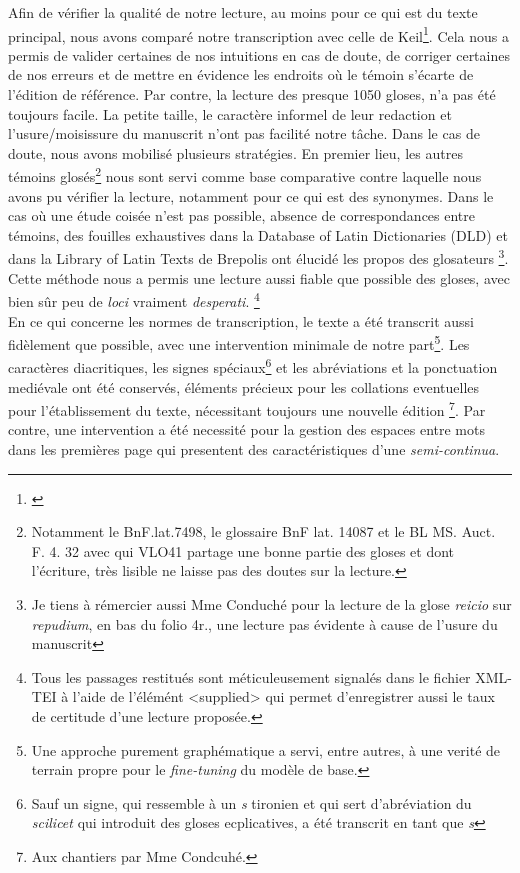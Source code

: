 \documentclass[a4paper, twoside, 12pt]{book}
\begin{document}
Afin de vérifier la qualité de notre lecture, au moins pour ce qui est du texte principal, nous avons comparé notre transcription avec celle de Keil\footnote{\cite{keil1857grammatici}}. Cela nous a permis de valider certaines de nos intuitions en cas de doute, de corriger certaines de nos erreurs et de mettre en évidence les endroits où le témoin s'écarte de l'édition de référence. Par contre, la lecture des presque 1050 gloses, n'a pas été toujours facile. La petite taille, le caractère informel de leur redaction et l'usure/moisissure du manuscrit n'ont pas facilité notre tâche. Dans le cas de doute, nous avons mobilisé plusieurs stratégies. En premier lieu, les autres témoins glosés\footnote{Notamment le BnF.lat.7498, le glossaire BnF lat. 14087 et le BL MS. Auct. F. 4. 32 avec qui VLO41 partage une bonne partie des gloses et dont l'écriture, très lisible ne laisse pas des doutes sur la lecture.} nous sont servi comme base comparative contre laquelle nous avons pu vérifier la lecture, notamment pour ce qui est des synonymes. Dans le cas où une étude coisée n'est pas possible, absence de correspondances entre témoins, des fouilles exhaustives dans la Database of Latin Dictionaries (DLD) et dans la Library of Latin Texts de Brepolis ont élucidé les propos des glosateurs \footnote{Je tiens à rémercier aussi Mme Conduché pour la lecture de la glose \textit{reicio} sur \textit{repudium}, en bas du folio 4r., une lecture pas évidente à cause de l'usure du manuscrit}. Cette méthode nous a permis une lecture aussi fiable que possible des gloses,  avec bien sûr peu de \textit{loci} vraiment \textit{desperati}. \footnote{Tous les passages restitués sont méticuleusement signalés dans le fichier XML-TEI à l'aide de l'élémént <supplied> qui permet d'enregistrer aussi le taux de certitude d'une lecture proposée.} \\

En ce qui concerne les normes de transcription, le texte a été transcrit aussi fidèlement que possible, avec une intervention minimale de notre part\footnote{Une approche purement graphématique a servi, entre autres, à une verité de terrain propre pour le \textit{fine-tuning} du modèle de base.}. Les caractères diacritiques, les signes spéciaux\footnote{Sauf un signe, qui ressemble à un \textit{s} tironien et qui sert d'abréviation du \textit{scilicet} qui introduit des gloses ecplicatives, a été transcrit en tant que \textit{s}} et les abréviations et la ponctuation mediévale ont été conservés, éléments précieux pour les collations eventuelles pour l'établissement du texte, nécessitant toujours une nouvelle édition \footnote{Aux chantiers par Mme Condcuhé.}. Par contre, une intervention a été necessité pour la gestion des espaces entre mots dans les premières page qui presentent des caractéristiques d'une \textit{semi-continua}.\\
\end{document}
